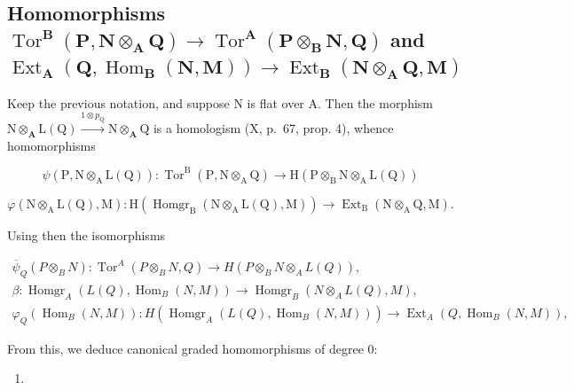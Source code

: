\subsection{\texorpdfstring{Homomorphisms \(\operatorname{Tor}^{\mathbf{B}}(\mathbf{P},\mathbf{N}\otimes_{\mathbf{A}}\mathbf{Q})\to \operatorname{Tor}^{\mathbf{A}}(\mathbf{P}\otimes_{\mathbf{B}}\mathbf{N},\mathbf{Q})\) and \(\operatorname{Ext}_{\mathbf{A}}(\mathbf{Q},\operatorname{Hom}_{\mathbf{B}}(\mathbf{N},\mathbf{M}))\to \operatorname{Ext}_{\mathbf{B}}(\mathbf{N}\otimes_{\mathbf{A}}\mathbf{Q},\mathbf{M})\)}{Change-of-rings homomorphisms for Tor and Ext}}

Keep the previous notation, and suppose N is flat over A. Then the morphism \(\mathrm{N}\otimes_{\mathbf{A}}\mathrm{L}(\mathrm{Q})\xrightarrow{\mathrm{1}\otimes p_{\mathrm{Q}}} \mathrm{N}\otimes_{\mathbf{A}}\mathrm{Q}\) is a homologism (X, p.~67, prop. 4), whence homomorphisms

\[
\psi (\mathrm{P}, \mathrm{N} \otimes_ {\mathrm{A}} \mathrm{L} (\mathrm{Q})): \operatorname{Tor} ^ {\mathrm{B}} (\mathrm{P}, \mathrm{N} \otimes_ {\mathrm{A}} \mathrm{Q}) \rightarrow \mathrm{H} (\mathrm{P} \otimes_ {\mathrm{B}} \mathrm{N} \otimes_ {\mathrm{A}} \mathrm{L} (\mathrm{Q}))
\]

\[
\varphi (\mathrm{N} \otimes_ {\mathrm{A}} \mathrm{L} (\mathrm{Q}), \mathrm{M}): \mathrm{H} (\operatorname{Homgr} _ {\mathrm{B}} (\mathrm{N} \otimes_ {\mathrm{A}} \mathrm{L} (\mathrm{Q}), \mathrm{M})) \rightarrow \operatorname{Ext} _ {\mathrm{B}} (\mathrm{N} \otimes_ {\mathrm{A}} \mathrm{Q}, \mathrm{M}).
\]

Using then the isomorphisms

\[
\begin{array}{c} \overline {{\psi}} _ {Q} (P \otimes_ {B} N): \operatorname{Tor} ^ {A} (P \otimes_ {B} N, Q) \to H (P \otimes_ {B} N \otimes_ {A} L (Q)), \\ \beta : \operatorname{Homgr} _ {A} (L (Q), \operatorname{Hom} _ {B} (N, M)) \to \operatorname{Homgr} _ {B} (N \otimes_ {A} L (Q), M), \\ \varphi_ {Q} (\operatorname{Hom} _ {B} (N, M)): H (\operatorname{Homgr} _ {A} (L (Q), \operatorname{Hom} _ {B} (N, M))) \to \operatorname{Ext} _ {A} (Q, \operatorname{Hom} _ {B} (N, M)), \end{array}
\]

From this, we deduce canonical graded homomorphisms of degree 0:

\begin{enumerate}
\def\labelenumi{(\arabic{enumi})}
\setcounter{enumi}{10}
\tightlist
\item
\end{enumerate}

